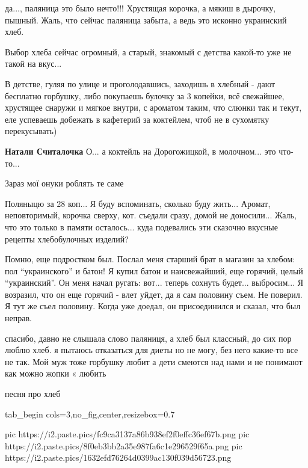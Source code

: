 \begin{itemize}
\begin{itemize}
да..., паляница это было нечто!!! Хрустящая корочка, а мякиш в дырочку, пышный.
Жаль, что сейчас паляница забыта, а ведь это исконно украинский хлеб.

\end{itemize} %


Выбор хлеба сейчас огромный, а старый, знакомый с детства какой-то уже не такой
на вкус...

В детстве, гуляя по улице и проголодавшись, заходишь в хлебный - дают бесплатно
горбушку, либо покупаешь булочку за 3 копейки, всё свежайшее, хрустящее снаружи
и мягкое внутри, с ароматом таким, что слюнки так и текут, еле успеваешь
добежать в кафетерий за коктейлем, чтоб не в сухомятку перекусывать)

\textbf{Натали Считалочка} О... а коктейль на Дорогожицкой, в молочном... это что-то...

Зараз мої онуки роблять те саме


Поляныцю за 28 коп... Я буду вспоминать, сколько буду жить... Аромат,
неповторимый, корочка сверху, кот. съедали сразу, домой не доносили... Жаль,
что это только в памяти осталось... куда подевались эти сказочно вкусные
рецепты хлебобулочных изделий?



Помню, еще подростком был. Послал меня старший брат в магазин за хлебом: пол
\enquote{украинского} и батон! Я купил батон и наисвежайший, еще горячий, целый
\enquote{украинский}. Он меня начал ругать: вот... теперь сохнуть будет... выбросим...
Я возразил, что он еще горячий - влет уйдет, да я сам половину съем. Не
поверил. Я тут же съел половину. Когда уже доедал, он присоединился и сказал,
что был неправ.


спасибо, давно не слышала слово паляниця, а хлеб был классный, до сих пор люблю
хлеб. я пытаюсь отказаться для диеты но не могу, без него какие-то все не так.
Мой муж тоже горбушку любит а дети смеются над нами и не понимают как можно
жопки « любить

песня про хлеб

\ifcmt
  tab_begin cols=3,no_fig,center,resizebox=0.7

     pic https://i2.paste.pics/fc9ca3137a86b938ef2f0effc36ef67b.png
		 pic https://i2.paste.pics/8f0eb3bb2a35e987fa6c1e296529f65a.png
		 pic https://i2.paste.pics/1632efd76264d0399ac130f039d56723.png


\end{itemize}
